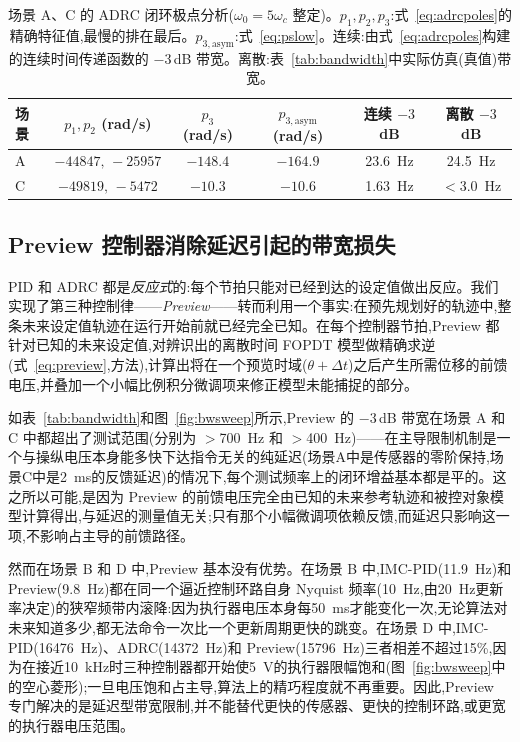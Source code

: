 \documentclass[fleqn,10pt]{wlscirep}
\begin{document}
\begin{table}[ht]
    \centering
    \caption{场景 A、C 的 ADRC 闭环极点分析($\omega_0=5\omega_c$ 整定)。$p_1,p_2,p_3$:式~\ref{eq:adrcpoles}的精确特征值,最慢的排在最后。$p_{3,\text{asym}}$:式~\ref{eq:pslow}。连续:由式~\ref{eq:adrcpoles}构建的连续时间传递函数的 $-3$\,dB 带宽。离散:表~\ref{tab:bandwidth}中实际仿真(真值)带宽。}
    \label{tab:poles}
    \begin{tabular}{lccccc}
        \toprule
        场景 & $p_1,p_2$ (rad/s) & $p_3$ (rad/s) & $p_{3,\text{asym}}$ (rad/s) & 连续 $-3$dB & 离散 $-3$dB \\
        \midrule
        A & $-44847,\,-25957$ & $-148.4$ & $-164.9$ & \SI{23.6}{Hz} & \SI{24.5}{Hz} \\
        C & $-49819,\,-5472$  & $-10.3$  & $-10.6$  & \SI{1.63}{Hz} & $<$\SI{3.0}{Hz} \\
        \bottomrule
    \end{tabular}
\end{table}

\subsection*{Preview 控制器消除延迟引起的带宽损失}

PID 和 ADRC 都是\emph{反应式}的:每个节拍只能对已经到达的设定值做出反应。我们实现了第三种控制律——\emph{Preview}——转而利用一个事实:在预先规划好的轨迹中,整条未来设定值轨迹在运行开始前就已经完全已知。在每个控制器节拍,Preview 都针对已知的未来设定值,对辨识出的离散时间 FOPDT 模型做精确求逆(式~\ref{eq:preview},方法),计算出将在一个预览时域($\theta + \Delta t$)之后产生所需位移的前馈电压,并叠加一个小幅比例积分微调项来修正模型未能捕捉的部分。

如表~\ref{tab:bandwidth}和图~\ref{fig:bwsweep}所示,Preview 的 $-3$\,dB 带宽在场景 A 和 C 中都超出了测试范围(分别为 $>$\SI{700}{Hz} 和 $>$\SI{400}{Hz})——在主导限制机制是一个与操纵电压本身能多快下达指令无关的纯延迟(场景A中是传感器的零阶保持,场景C中是\SI{2}{ms}的反馈延迟)的情况下,每个测试频率上的闭环增益基本都是平的。这之所以可能,是因为 Preview 的前馈电压完全由已知的未来参考轨迹和被控对象模型计算得出,与延迟的测量值无关;只有那个小幅微调项依赖反馈,而延迟只影响这一项,不影响占主导的前馈路径。

然而在场景 B 和 D 中,Preview 基本没有优势。在场景 B 中,IMC-PID(\SI{11.9}{Hz})和 Preview(\SI{9.8}{Hz})都在同一个逼近控制环路自身 Nyquist 频率(\SI{10}{Hz},由\SI{20}{Hz}更新率决定)的狭窄频带内滚降:因为执行器电压本身每\SI{50}{ms}才能变化一次,无论算法对未来知道多少,都无法命令一次比一个更新周期更快的跳变。在场景 D 中,IMC-PID(\SI{16476}{Hz})、ADRC(\SI{14372}{Hz})和 Preview(\SI{15796}{Hz})三者相差不超过15\%,因为在接近\SI{10}{kHz}时三种控制器都开始使\SI{5}{V}的执行器限幅饱和(图~\ref{fig:bwsweep}中的空心菱形);一旦电压饱和占主导,算法上的精巧程度就不再重要。因此,Preview 专门解决的是延迟型带宽限制,并不能替代更快的传感器、更快的控制环路,或更宽的执行器电压范围。
\end{document}
